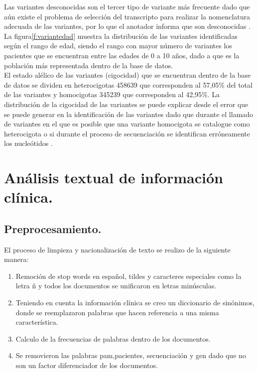 Las variantes desconocidas son el tercer tipo de variante más frecuente dado que aún existe el problema de selección del transcripto para realizar la nomenclatura adecuada de las variantes, por lo que el anotador informa que son desconocidas \cite{McCarthy2014}. La figura\ref{f:variantedad} muestra la distribución de las variantes identificadas según el rango de edad, siendo el rango con mayor número de variantes los pacientes que se encuentran entre las edades de 0 a 10 años, dado a que es la población más representada dentro de la base de datos. \\

El estado alélico de las variantes (cigocidad) que se encuentran dentro de la base de datos se dividen en heterocigotas 458639 que corresponden al 57,05\% del total de las variantes  y homocigotas 345239 que corresponden al 42,95\%. La distribución de la cigocidad de las variantes se puede explicar desde el error que se puede generar en la identificación de las variantes dado que durante el llamado  de variantes en el que es posible que una variante homocigota se catalogue como heterocigota o si durante el proceso de secuenciación se identifican erróneamente los nucleótidos \cite{Babraham2016}\cite{Pirooznia2014}. 


\section{Análisis textual de información clínica.}

 
\subsection{Preprocesamiento.}

El proceso de limpieza y nacionalización de texto se realizo de la siguiente manera:

 \begin{enumerate}
 	\item Remoción de stop words en español, tildes y caracteres especiales como  la letra ñ y todos los documentos se unificaron en letras minúsculas.
 	\item Teniendo en cuenta la información clínica se creo un diccionario de sinónimos, donde se reemplazaron palabras que hacen referencia a una misma característica.
 	\item Calculo de la frecuencias de palabras dentro de los documentos. 
 	\item Se removieron las palabras pam,pacientes, secuenciación y gen dado que no son un factor diferenciador de los documentos.  	  
 \end{enumerate}

